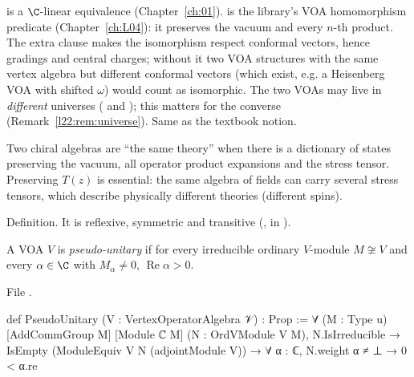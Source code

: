\begin{dictionary}
 is a $\C$-linear equivalence (Chapter~\ref{ch:01}).  is
the library's VOA homomorphism predicate (Chapter~\ref{ch:L04}): it preserves the vacuum and every
$n$-th product. The extra clause  makes the isomorphism
respect conformal vectors, hence gradings and central charges; without it two VOA structures with the
same vertex algebra but different conformal vectors (which exist, e.g. a Heisenberg VOA with shifted
$\omega$) would count as isomorphic. The two VOAs may live in \emph{different} universes ( and
); this matters for the converse (Remark~\ref{l22:rem:universe}). Same as the textbook notion.
\end{dictionary}

\begin{physics}
Two chiral algebras are ``the same theory'' when there is a dictionary of states preserving the vacuum,
all operator product expansions and the stress tensor. Preserving $T(z)$ is essential: the same algebra of
fields can carry several stress tensors, which describe physically different theories (different spins).
\end{physics}

\begin{status}
Definition. It is reflexive, symmetric and transitive (,  in
).
\end{status}

\begin{definition}\label{l22:def:pu}
A VOA $V$ is \emph{pseudo-unitary} if for every irreducible ordinary $V$-module $M\not\cong V$ and every
$\alpha\in\C$ with $M_\alpha\neq0$, $\operatorname{Re}\alpha>0$.
\end{definition}
\noindent File .
\begin{leancode}
def PseudoUnitary (V : VertexOperatorAlgebra 𝒱) : Prop :=
  ∀ (M : Type u) [AddCommGroup M] [Module ℂ M] (N : OrdVModule V M),
    N.IsIrreducible → IsEmpty (ModuleEquiv V N (adjointModule V)) →
      ∀ α : ℂ, N.weight α ≠ ⊥ → 0 < α.re
\end{leancode}

